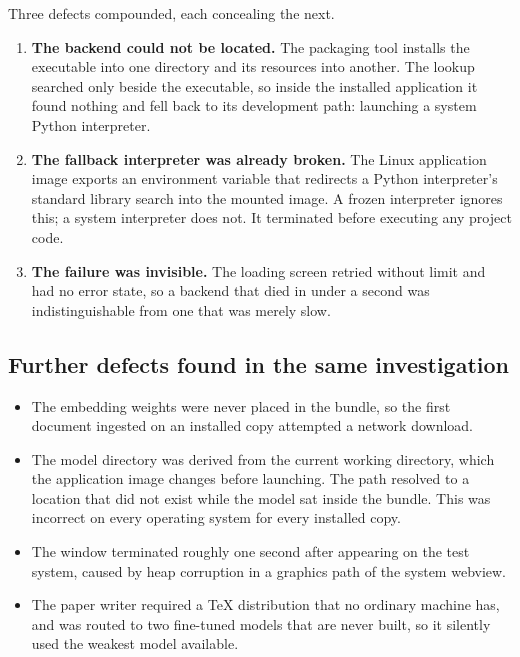 \documentclass[11pt,a4paper]{article}
\begin{document}
Three defects compounded, each concealing the next.

\begin{enumerate}[leftmargin=*]
  \item \textbf{The backend could not be located.} The packaging tool installs
        the executable into one directory and its resources into another. The
        lookup searched only beside the executable, so inside the installed
        application it found nothing and fell back to its development path:
        launching a system Python interpreter.
  \item \textbf{The fallback interpreter was already broken.} The Linux
        application image exports an environment variable that redirects a
        Python interpreter's standard library search into the mounted image. A
        frozen interpreter ignores this; a system interpreter does not. It
        terminated before executing any project code.
  \item \textbf{The failure was invisible.} The loading screen retried without
        limit and had no error state, so a backend that died in under a second
        was indistinguishable from one that was merely slow.
\end{enumerate}

\subsection{Further defects found in the same investigation}

\begin{itemize}[leftmargin=*]
  \item The embedding weights were never placed in the bundle, so the first
        document ingested on an installed copy attempted a network download.
  \item The model directory was derived from the current working directory,
        which the application image changes before launching. The path resolved
        to a location that did not exist while the model sat inside the bundle.
        This was incorrect on every operating system for every installed copy.
  \item The window terminated roughly one second after appearing on the test
        system, caused by heap corruption in a graphics path of the system
        webview.
  \item The paper writer required a TeX distribution that no ordinary machine
        has, and was routed to two fine-tuned models that are never built, so it
        silently used the weakest model available.
\end{itemize}
\end{document}
